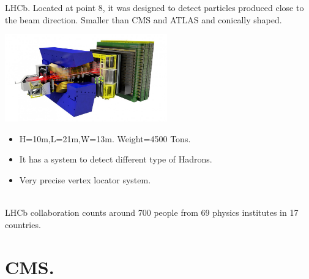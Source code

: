\documentclass[8pt]{beamer}
\begin{document}
\begin{frame}[fragile]{LHCb.}
	Located at point 8, it was designed to detect particles produced close to the beam direction.
	Smaller than CMS and ATLAS and conically shaped.

	\vspace{0.5cm}
	\begin{minipage}{0.7\textwidth}%
		\includegraphics[width=7cm]{8}
	\end{minipage}%
	\hfill%
	\begin{minipage}{0.3\textwidth}\raggedleft
		\begin{itemize}
			\item H=10m,L=21m,W=13m. Weight=4500 Tons.		
			\item It has a system to detect different type of Hadrons.
			\item Very precise vertex locator system.
		
		\end{itemize}
	\end{minipage}
	\\
	\vspace{0.5cm}
	LHCb collaboration counts around 700 people from 69 physics institutes in 17 countries.
\end{frame}


\section{CMS.}

\end{document}

